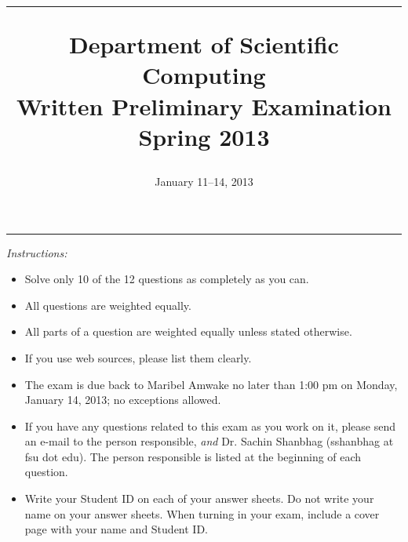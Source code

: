 \documentclass[11pt,letterpaper]{article}
\newcommand{\highlight}[1]{\textcolor{BrickRed}{#1}}
\begin{document}
\makeatletter	   %
\renewcommand{\ps@plain}{%
     \renewcommand{\@oddhead}{\textrm{\small {Spring 2013}}\hfil\textrm{\thepage}}%
     \renewcommand{\@evenhead}{\@oddhead}%
     \renewcommand{\@oddfoot}{}%
     \renewcommand{\@evenfoot}{\@oddfoot}}
\makeatother     %

\title{
\hrule 
\bigskip
Department of Scientific Computing\\
\highlight{\textbf{Written Preliminary Examination}} \\
Spring 2013 \\
}         %
\author{}        %
\date{January 11--14, 2013}          %
\maketitle

\pagestyle{plain}

\hrule 
\bigskip
\textit{Instructions:}

\bigskip

\begin{itemize}
\item Solve only 10 of the 12 questions as completely as you can. 

\item All questions are weighted equally.

\item All parts of a question are weighted equally unless stated otherwise.

\item If you use web sources, please list them clearly.

\item The exam is due back to Maribel Amwake no later than 1:00 pm on Monday, January 14, 2013; no exceptions allowed.

\item If you have any questions related to this exam as you work on it, please send an e-mail to the person responsible, \textit{and} Dr. Sachin Shanbhag (sshanbhag at fsu dot edu). The person responsible is listed at the beginning of each question.

\item Write your Student ID on each of your answer sheets. Do not write your name on your answer sheets. When turning in your exam, include a cover page with your name and Student ID.

\end{itemize}
\end{document}

